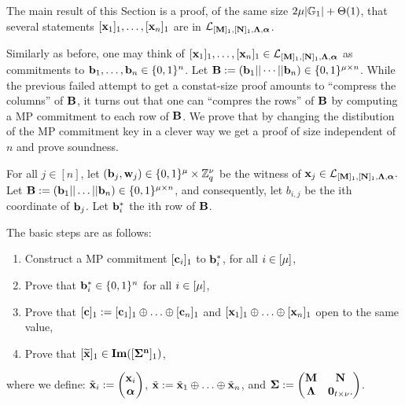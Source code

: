 The main result of this Section is a proof, of the same size $2{\mu}|\mathbb{G}_1|+\Theta(1)$, that several statements $[\mathbf{x}_1]_1,\ldots,[\mathbf{x}_n]_1$ are in $\mathcal{L}_{[\mathbf{{M}}]_1,[\mathbf{{N}}]_1,\mathbf{{\Lambda}},{\boldsymbol \alpha}}$.

Similarly as before, one may think of $[\mathbf{x}_1]_1,\ldots,[\mathbf{x}_n]_1\in{\mathcal{L}_{[\mathbf{{M}}]_1,[\mathbf{{N}}]_1,\mathbf{{\Lambda}},{\boldsymbol \alpha}}}$ as commitments to $\mathbf{b}_1,\ldots,\mathbf{b}_n\in\{0,1\}^n$. Let $\mathbf{{B}}:=(\mathbf{b}_1||\cdots||\mathbf{b}_n)\in\{0,1\}^{{\mu}\times n}$. While the previous failed attempt to get a constat-size proof amounts to ``compress the columns'' of $\mathbf{{B}}$, it turns out that one can ``compres the rows'' of $\mathbf{{B}}$ by computing a MP commitment to each row of $\mathbf{{B}}$. We prove that by changing the distibution of the MP commitment key in a clever way we get a proof of size independent of $n$ and prove soundness.
 

For all $j \in [n]$, let $(\mathbf{b}_j,\mathbf{w}_j) \in \{0,1\}^{{\mu}} \times \mathbb{Z}_q^{{\nu}}$ be the witness of $\mathbf{x}_j \in \mathcal{L}_{[\mathbf{{M}}]_1,[\mathbf{{N}}]_1,\mathbf{{\Lambda}},{\boldsymbol \alpha}}.$ Let $\mathbf{{B}}:=(\mathbf{b}_1|| \ldots ||\mathbf{b}_n) \in \{0,1\}^{{\mu} \times n}$, 
and consequently, let $b_{i,j}$ be the ith coordinate of $\mathbf{b}_j$. Let 
 $\mathbf{b}^*_{i}$ the ith row of $\mathbf{{B}}$. 
 
The basic steps are as follows:
\begin{enumerate}
\item Construct a MP commitment $[\mathbf{c}_i]_1$ to $\mathbf{b}^*_i$, for all $i \in [{\mu}]$,
\item Prove that $\mathbf{b}^*_i \in \{0,1\}^{n}$ for all $i \in [{\mu}]$, 
\item Prove that $[\mathbf{c}]_1:=[\mathbf{c}_1]_1 \oplus \ldots \oplus [\mathbf{c}_n]_1$ and $[\mathbf{x}_1]_1 \oplus \ldots \oplus [\mathbf{x}_n]_1$ open to the same value,
\item Prove that $[\widetilde{\mathbf{x}}]_1 \in \mathbf{Im}([\mathbf{{\Sigma^n}}]_1)$, 
\end{enumerate}
where we define: $\tilde{\mathbf{x}}_i:=  \left(\begin{matrix}
    \mathbf{x}_i\\
    {\boldsymbol \alpha}
\end{matrix}\right)$, $\tilde{\mathbf{x}}:= \tilde{\mathbf{x}}_1 \oplus 
\ldots \oplus  \tilde{\mathbf{x}}_n$, and
$\mathbf{{\Sigma}}:=\begin{pmatrix}
    \mathbf{{M}}       & \mathbf{{N}}\\
    \mathbf{{\Lambda}} & \mathbf{{0}}_{t\times {\nu}}.
    \end{pmatrix}$. 

